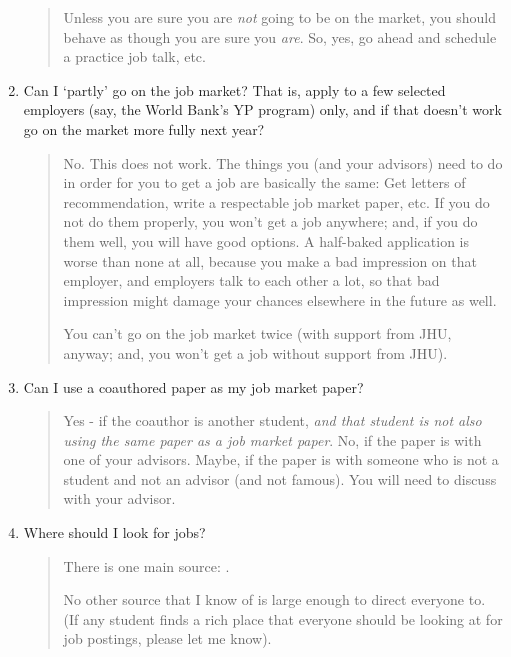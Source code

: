 \documentclass{\classes/econtex}
\begin{document}
\begin{enumerate}
  \begin{quote}
    Unless you are sure you are \textit{not} going to be on the market, you should behave as though you are sure you \textit{are}.  So, yes, go ahead and schedule a practice job talk, etc.

  \end{quote}
\item  Can I `partly' go on the job market?  That is, apply to a few
  selected employers (say, the World Bank's YP program) only, and 
  if that doesn't work go on the market more fully next year?

  \begin{quote}
    No.  This does not work.  The things you (and your advisors) need to do in order for you to
    get a job are basically the same: Get letters of recommendation, 
    write a respectable job market paper, etc.  If you do not do them
    properly, you won't get a job anywhere; and, if you do them well,
    you will have good options.  A half-baked application is worse than
    none at all, because you make a bad impression on that employer, and 
    employers talk to each other a lot, so that bad impression might damage
    your chances elsewhere in the future as well.  

    You can't go on the job market twice (with support from JHU, anyway; and, you won't
    get a job without support from JHU).

  \end{quote}
\item  Can I use a coauthored paper as my job market paper?

  \begin{quote}
    Yes - if the coauthor is another student, \textit{and that student is not
    also using the same paper as a job market paper}.  No, if the paper is with one of your
    advisors.  Maybe, if the paper is with someone who is not a student
    and not an advisor (and not famous).  You will need to discuss with your advisor.
    \hypertarget{Where-Should-I-Look-for-Jobs}{}

  \end{quote}

\item  Where should I look for jobs? 

  \begin{quote}
    There is one main source: \JOE.

    No other source that I know of is large enough to direct everyone to. (If any student finds a rich place that everyone should be looking at for job postings, please let me know).


\end{quote}
\end{enumerate}
\end{document}
